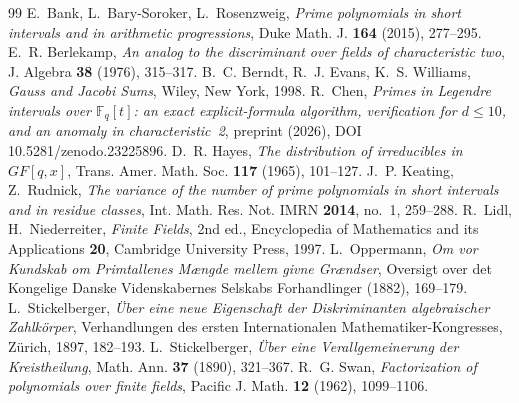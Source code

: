 \documentclass[11pt,a4paper]{amsart}
\theoremstyle{definition}
\theoremstyle{remark}
\newcommand{\F}{\mathbb{F}}
\begin{document}
\begin{thebibliography}{99}
 E.~Bank, L.~Bary-Soroker, L.~Rosenzweig, \emph{Prime polynomials in short intervals and in arithmetic
progressions}, Duke Math. J. \textbf{164} (2015), 277--295.
 E.~R. Berlekamp, \emph{An analog to the discriminant over fields of characteristic two},
J. Algebra \textbf{38} (1976), 315--317.
 B.~C. Berndt, R.~J. Evans, K.~S. Williams, \emph{Gauss and Jacobi Sums}, Wiley, New York, 1998.
 R.~Chen, \emph{Primes in Legendre intervals over $\F_q[t]$: an exact explicit-formula algorithm,
verification for $d\le10$, and an anomaly in characteristic~2}, preprint (2026), DOI 10.5281/zenodo.23225896.
 D.~R. Hayes, \emph{The distribution of irreducibles in $GF[q,x]$}, Trans. Amer. Math. Soc.
\textbf{117} (1965), 101--127.
 J.~P. Keating, Z.~Rudnick, \emph{The variance of the number of prime polynomials in short intervals and
in residue classes}, Int. Math. Res. Not. IMRN \textbf{2014}, no.~1, 259--288.
 R.~Lidl, H.~Niederreiter, \emph{Finite Fields}, 2nd ed., Encyclopedia of Mathematics and its
Applications \textbf{20}, Cambridge University Press, 1997.
 L.~Oppermann, \emph{Om vor Kundskab om Primtallenes M\ae ngde mellem givne Gr\ae ndser},
Oversigt over det Kongelige Danske Videnskabernes Selskabs Forhandlinger (1882), 169--179.
 L.~Stickelberger, \emph{\"Uber eine neue Eigenschaft der Diskriminanten algebraischer
Zahlk\"orper}, Verhandlungen des ersten Internationalen Mathematiker-Kongresses, Z\"urich, 1897, 182--193.
 L.~Stickelberger, \emph{\"Uber eine Verallgemeinerung der Kreistheilung}, Math. Ann.
\textbf{37} (1890), 321--367.
 R.~G. Swan, \emph{Factorization of polynomials over finite fields}, Pacific J. Math. \textbf{12}
(1962), 1099--1106.
\end{thebibliography}
\end{document}
